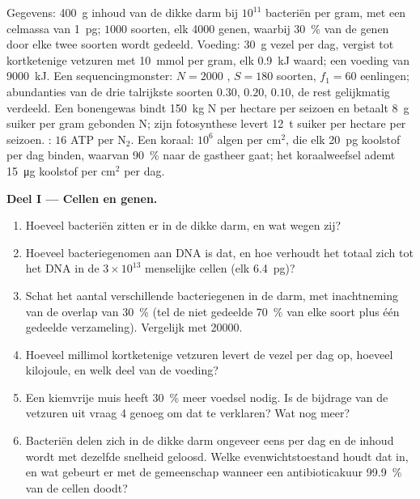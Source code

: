 \begin{problem}
\label{pb:b3:microbiomes:1}
Gegevens: \qty{400}{g} inhoud van de dikke darm bij $10^{11}$ bacteriën
per gram, met een celmassa van \qty{1}{pg}; $1000$ soorten, elk
\num{4000} genen, waarbij \qty{30}{\%} van de genen door elke twee
soorten wordt gedeeld. Voeding: \qty{30}{g} vezel per dag, vergist tot
kortketenige vetzuren met \qty{10}{mmol} per gram, elk \qty{0.9}{kJ}
waard; een voeding van \qty{9000}{kJ}. Een sequencingmonster: $N = 2000$
, $S = 180$ soorten, $f_{1} = 60$ eenlingen; abundanties van de
drie talrijkste soorten $0.30$, $0.20$, $0.10$, de rest gelijkmatig
verdeeld. Een bonengewas bindt \qty{150}{kg} N per hectare per seizoen
en betaalt \qty{8}{g} suiker per gram gebonden N; zijn fotosynthese
levert \qty{12}{t} suiker per hectare per seizoen. : $16$ ATP
per N$_{2}$. Een koraal: $10^{6}$ algen per cm$^{2}$, die elk
\qty{20}{pg} koolstof per dag binden, waarvan \qty{90}{\%} naar de
gastheer gaat; het koraalweefsel ademt \qty{15}{\micro g} koolstof per
cm$^{2}$ per dag.

\medskip
\noindent\textbf{Deel I --- Cellen en genen.}
\begin{enumerate}
  \item Hoeveel bacteriën zitten er in de dikke darm, en wat wegen zij?
  \item Hoeveel bacteriegenomen aan DNA is dat, en hoe verhoudt het
        totaal zich tot het DNA in de $3\times 10^{13}$ menselijke
        cellen (elk \qty{6.4}{pg})?
  \item Schat het aantal verschillende bacteriegenen in de darm, met
        inachtneming van de overlap van \qty{30}{\%} (tel de niet
        gedeelde \qty{70}{\%} van elke soort plus één gedeelde
        verzameling). Vergelijk met \num{20000}.
  \item Hoeveel millimol kortketenige vetzuren levert de vezel per dag
        op, hoeveel kilojoule, en welk deel van de voeding?
  \item Een kiemvrije muis heeft \qty{30}{\%} meer voedsel nodig. Is de
        bijdrage van de vetzuren uit vraag 4 genoeg om dat te
        verklaren? Wat nog meer?
  \item Bacteriën delen zich in de dikke darm ongeveer eens per dag en
        de inhoud wordt met dezelfde snelheid geloosd. Welke
        evenwichtstoestand houdt dat in, en wat gebeurt er met de
        gemeenschap wanneer een antibioticakuur \qty{99.9}{\%} van de
        cellen doodt?
\end{enumerate}


\end{problem}
